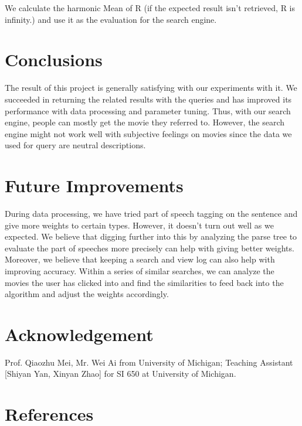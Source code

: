 \documentclass[letterpaper,10pt]{article}
\begin{document}
\begin{multicols}{2}
    We calculate the harmonic Mean of R (if the expected result isn’t retrieved, R is infinity.) and use it as the evaluation for the search engine.

    \section{Conclusions}

    The result of this project is generally satisfying with our experiments with it. We succeeded in returning the related results with the queries and has improved its performance with data processing and parameter tuning. Thus, with our search engine, people can mostly get the movie they referred to. However, the search engine might not work well with subjective feelings on movies since the data we used for query are neutral descriptions.

    \section{Future Improvements}
    During data processing, we have tried part of speech tagging on the sentence and give more weights to certain types. However, it doesn’t turn out well as we expected. We believe that digging further into this by analyzing the parse tree to evaluate the part of speeches more precisely can help with giving better weights.
    Moreover, we believe that keeping a search and view log can also help with improving accuracy. Within a series of similar searches, we can analyze the movies the user has clicked into and find the similarities to feed back into the algorithm and adjust the weights accordingly.

    \section{Acknowledgement}

    Prof. Qiaozhu Mei, Mr. Wei Ai from University of Michigan;
    Teaching Assistant [Shiyan Yan, Xinyan Zhao] for SI 650 at University of Michigan.

    \section*{References}





\end{multicols}
\end{document}
